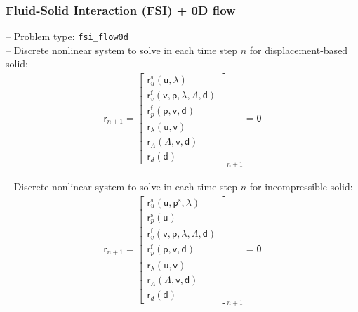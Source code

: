 \documentclass[a4paper,12pt]{report}
\newcommand{\bs}[1]{\boldsymbol{#1}}
\newcommand{\ROP}{\bs{\mathsf{r}}}
\newcommand{\LM}{\bs{\mathsf{\lambda}}}
\newcommand{\LMZ}{\bs{\mathsf{\Lambda}}}
\begin{document}
\subsubsection{Fluid-Solid Interaction (FSI) + 0D flow}\label{subsubsec:fsi_flow0d}

-- Problem type: \verb"fsi_flow0d"\\

-- Discrete nonlinear system to solve in each time step $n$ for displacement-based solid:
\begin{align}
\ROP_{n+1} = \begin{bmatrix} \ROP_{u}^{\mathrm{s}}(\bs{\mathsf{u}},\LM) \\ \ROP_{v}^{\mathrm{f}}(\bs{\mathsf{v}},\bs{\mathsf{p}},\LM,\LMZ,\bs{\mathsf{d}}) \\ \ROP_{p}^{\mathrm{f}}(\bs{\mathsf{p}},\bs{\mathsf{v}},\bs{\mathsf{d}}) \\ \ROP_{\lambda}(\bs{\mathsf{u}},\bs{\mathsf{v}}) \\ \ROP_{\mathit{\Lambda}}(\LMZ,\bs{\mathsf{v}},\bs{\mathsf{d}}) \\ \ROP_{d}(\bs{\mathsf{d}}) \end{bmatrix}_{n+1} = \bs{\mathsf{0}}\label{eq:nonlin_sys_fsi_0d}
\end{align}

-- Discrete nonlinear system to solve in each time step $n$ for incompressible solid:
\begin{align}
\ROP_{n+1} = \begin{bmatrix} \ROP_{u}^{\mathrm{s}}(\bs{\mathsf{u}},\bs{\mathsf{p}}^{\mathrm{s}},\LM) \\ \ROP_{p}^{\mathrm{s}}(\bs{\mathsf{u}}) \\ \ROP_{v}^{\mathrm{f}}(\bs{\mathsf{v}},\bs{\mathsf{p}},\LM,\LMZ,\bs{\mathsf{d}}) \\ \ROP_{p}^{\mathrm{f}}(\bs{\mathsf{p}},\bs{\mathsf{v}},\bs{\mathsf{d}}) \\ \ROP_{\lambda}(\bs{\mathsf{u}},\bs{\mathsf{v}}) \\ \ROP_{\mathit{\Lambda}}(\LMZ,\bs{\mathsf{v}},\bs{\mathsf{d}}) \\ \ROP_{d}(\bs{\mathsf{d}}) \end{bmatrix}_{n+1} = \bs{\mathsf{0}}\label{eq:nonlin_sys_fsi_0d_inc}
\end{align}
\end{document}

